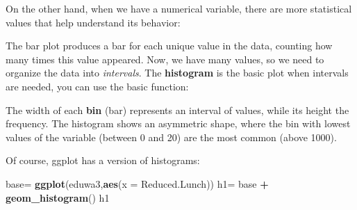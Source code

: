 \documentclass[]{article}
\newenvironment{Shaded}{\begin{snugshade}}{\end{snugshade}}
\newcommand{\KeywordTok}[1]{\textcolor[rgb]{0.13,0.29,0.53}{\textbf{#1}}}
\newcommand{\DataTypeTok}[1]{\textcolor[rgb]{0.13,0.29,0.53}{#1}}
\newcommand{\DecValTok}[1]{\textcolor[rgb]{0.00,0.00,0.81}{#1}}
\newcommand{\FloatTok}[1]{\textcolor[rgb]{0.00,0.00,0.81}{#1}}
\newcommand{\StringTok}[1]{\textcolor[rgb]{0.31,0.60,0.02}{#1}}
\newcommand{\CommentTok}[1]{\textcolor[rgb]{0.56,0.35,0.01}{\textit{#1}}}
\newcommand{\OperatorTok}[1]{\textcolor[rgb]{0.81,0.36,0.00}{\textbf{#1}}}
\newcommand{\NormalTok}[1]{#1}
\begin{document}
\begin{Shaded}
\end{Shaded}

On the other hand, when we have a numerical variable, there are more
statistical values that help understand its behavior:

\begin{Shaded}
\end{Shaded}

The bar plot produces a bar for each unique value in the data, counting
how many times this value appeared. Now, we have many values, so we need
to organize the data into \emph{intervals}. The \textbf{histogram} is
the basic plot when intervals are needed, you can use the basic
function:

\begin{Shaded}
\end{Shaded}

The width of each \textbf{bin} (bar) represents an interval of values,
while its height the frequency. The histogram shows an asymmetric shape,
where the bin with lowest values of the variable (between 0 and 20) are
the most common (above 1000).

Of course, ggplot has a version of histograms:

\begin{Shaded}
\begin{Highlighting}[]
\NormalTok{base=}\StringTok{ }\KeywordTok{ggplot}\NormalTok{(eduwa3,}\KeywordTok{aes}\NormalTok{(}\DataTypeTok{x =}\NormalTok{ Reduced.Lunch))  }
\NormalTok{h1=}\StringTok{ }\NormalTok{base }\OperatorTok{+}\StringTok{ }\KeywordTok{geom_histogram}\NormalTok{()}
\NormalTok{h1 }
\end{Highlighting}
\end{Shaded}
\end{document}
